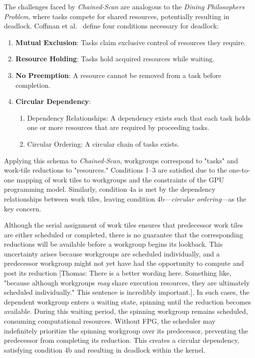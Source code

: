 \documentclass[sigconf]{acmart}
\newcommand{\thomas}[1]{{\footnotesize\color{orange}[Thomas: #1]}}
\begin{document}
The challenges faced by \emph{Chained-Scan} are analogous to the \emph{Dining Philosophers Problem}, where tasks compete for shared resources, potentially resulting in deadlock. Coffman et al.~\cite{10.1145/356586.356588} define four conditions necessary for deadlock:
\begin{enumerate}
  \item \textbf{Mutual Exclusion}: Tasks claim exclusive control of resources they require.
  \item \textbf{Resource Holding}: Tasks hold acquired resources while waiting.
  \item \textbf{No Preemption}: A resource cannot be removed from a task before completion.
  \item \textbf{Circular Dependency}:
        \begin{enumerate}
          \item Dependency Relationships: A dependency exists such that each task holds one or more resources that are required by proceeding tasks.
          \item Circular Ordering: A circular chain of tasks exists.
        \end{enumerate}
\end{enumerate}
Applying this schema to \emph{Chained-Scan}, workgroups correspond to "tasks" and work-tile reductions to "resources." Conditions 1–3 are satisfied due to the one-to-one mapping of work tiles to workgroups and the constraints of the GPU programming model. Similarly, condition 4a is met by the dependency relationships between work tiles, leaving condition 4b---\emph{circular ordering}---as the key concern.

Although the serial assignment of work tiles ensures that predecessor work tiles are either scheduled or completed, there is no guarantee that the corresponding reductions will be available before a workgroup begins its lookback. This uncertainty arises because workgroups are scheduled individually, and a predecessor workgroup might not yet have had the opportunity to compute and post its reduction \thomas{There is a better wording here. Something like, "because although workgroups \emph{may} share execution resources, they are ultimately scheduled individually." This sentence is incredibly important.}. In such cases, the dependent workgroup enters a waiting state, spinning until the reduction becomes available. During this waiting period, the spinning workgroup remains scheduled, consuming computational resources. Without FPG, the scheduler may indefinitely prioritize the spinning workgroup over its predecessor, preventing the predecessor from completing its reduction. This creates a circular dependency, satisfying condition 4b and resulting in deadlock within the kernel.
\end{document}
